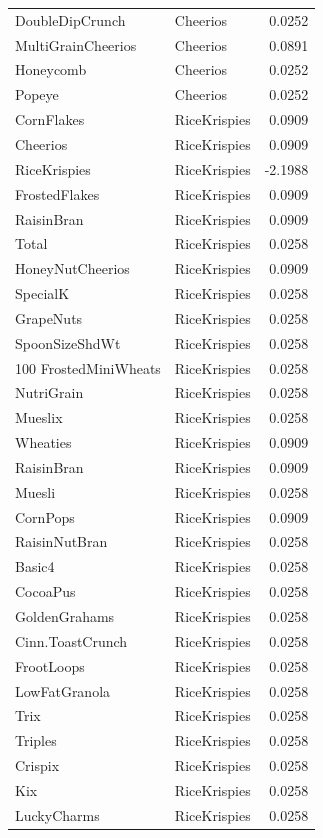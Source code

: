 \begin{longtable}{llr}
DoubleDipCrunch & Cheerios & 0.0252 \\
MultiGrainCheerios & Cheerios & 0.0891 \\
Honeycomb & Cheerios & 0.0252 \\
Popeye & Cheerios & 0.0252 \\
CornFlakes & RiceKrispies & 0.0909 \\
Cheerios & RiceKrispies & 0.0909 \\
RiceKrispies & RiceKrispies & -2.1988 \\
FrostedFlakes & RiceKrispies & 0.0909 \\
RaisinBran & RiceKrispies & 0.0909 \\
Total & RiceKrispies & 0.0258 \\
HoneyNutCheerios & RiceKrispies & 0.0909 \\
SpecialK & RiceKrispies & 0.0258 \\
GrapeNuts & RiceKrispies & 0.0258 \\
SpoonSizeShdWt & RiceKrispies & 0.0258 \\
100%
FrostedMiniWheats & RiceKrispies & 0.0258 \\
NutriGrain & RiceKrispies & 0.0258 \\
Mueslix & RiceKrispies & 0.0258 \\
Wheaties & RiceKrispies & 0.0909 \\
RaisinBran & RiceKrispies & 0.0909 \\
Muesli & RiceKrispies & 0.0258 \\
CornPops & RiceKrispies & 0.0909 \\
RaisinNutBran & RiceKrispies & 0.0258 \\
Basic4 & RiceKrispies & 0.0258 \\
CocoaPus & RiceKrispies & 0.0258 \\
GoldenGrahams & RiceKrispies & 0.0258 \\
Cinn.ToastCrunch & RiceKrispies & 0.0258 \\
FrootLoops & RiceKrispies & 0.0258 \\
LowFatGranola & RiceKrispies & 0.0258 \\
Trix & RiceKrispies & 0.0258 \\
Triples & RiceKrispies & 0.0258 \\
Crispix & RiceKrispies & 0.0258 \\
Kix & RiceKrispies & 0.0258 \\
LuckyCharms & RiceKrispies & 0.0258 \\

\end{longtable}
